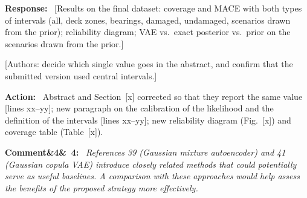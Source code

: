 \documentclass[11pt]{article}
\newenvironment{rcomment}[1]{\par\bigskip\noindent\textbf{Comment\ifx&#1&\else\ #1\fi:}\ \itshape}{\par}
\newenvironment{response}{\par\smallskip\noindent\color{resp}\textbf{Response:}\ }{\par}
\newenvironment{action}{\par\smallskip\noindent\color{resp}\textbf{Action:}\ }{\par}
\newcommand{\authornote}[1]{\textcolor{note}{\textsf{[Authors: #1]}}}
\newcommand{\tbd}[1]{\textcolor{note}{\textsf{[#1]}}}
\newcommand{\lines}[1]{\tbd{lines #1}}
\begin{document}
\begin{response}
\tbd{Results on the final dataset: coverage and MACE with both types of intervals (all, deck zones, bearings, damaged, undamaged,
scenarios drawn from the prior); reliability diagram; VAE vs.\ exact posterior vs.\ prior on the scenarios drawn from the prior.}
\end{response}
\authornote{decide which single value goes in the abstract, and confirm that the submitted version used central intervals.}

\begin{action}
Abstract and Section~\tbd{x} corrected so that they report the same value \lines{xx--yy}; new paragraph on the
calibration of the likelihood and the definition of the intervals \lines{xx--yy}; new reliability diagram (Fig.~\tbd{x})
and coverage table (Table~\tbd{x}).
\end{action}


\begin{rcomment}{4}
References 39 (Gaussian mixture autoencoder) and 41 (Gaussian copula VAE) introduce closely related methods that could
potentially serve as useful baselines. A comparison with these approaches would help assess the benefits of the proposed
strategy more effectively.
\end{rcomment}
\end{document}
